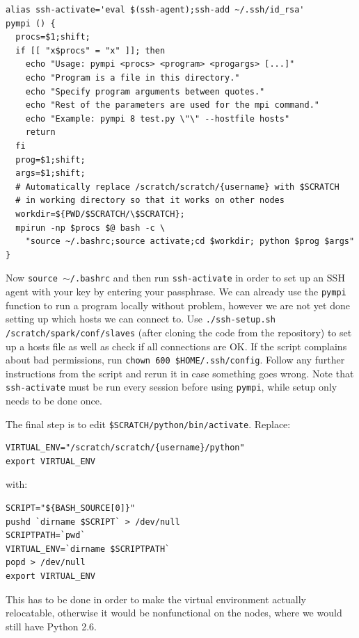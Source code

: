 \documentclass{article}
\begin{document}
\begin{verbatim}
alias ssh-activate='eval $(ssh-agent);ssh-add ~/.ssh/id_rsa'
pympi () {
  procs=$1;shift;
  if [[ "x$procs" = "x" ]]; then
    echo "Usage: pympi <procs> <program> <progargs> [...]"
    echo "Program is a file in this directory."
    echo "Specify program arguments between quotes."
    echo "Rest of the parameters are used for the mpi command."
    echo "Example: pympi 8 test.py \"\" --hostfile hosts"
    return
  fi
  prog=$1;shift;
  args=$1;shift;
  # Automatically replace /scratch/scratch/{username} with $SCRATCH
  # in working directory so that it works on other nodes
  workdir=${PWD/$SCRATCH/\$SCRATCH};
  mpirun -np $procs $@ bash -c \
    "source ~/.bashrc;source activate;cd $workdir; python $prog $args"
}
\end{verbatim}

Now \texttt{source $\sim$/.bashrc} and then run \texttt{ssh-activate} in order 
to set up an SSH agent with your key by entering your passphrase. We can 
already use the \texttt{pympi} function to run a program locally without 
problem, however we are not yet done setting up which hosts we can connect to. 
Use \texttt{./ssh-setup.sh /scratch/spark/conf/slaves} (after cloning the code 
from the repository) to set up a hosts file as well as check if all connections 
are OK\@. If the script complains about bad permissions, run \texttt{chown 600 
\$HOME/.ssh/config}. Follow any further instructions from the script and rerun 
it in case something goes wrong. Note that \texttt{ssh-activate} must be run 
every session before using \texttt{pympi}, while setup only needs to be done 
once.

The final step is to edit \texttt{\$SCRATCH/python/bin/activate}. Replace:

\begin{verbatim}
VIRTUAL_ENV="/scratch/scratch/{username}/python"
export VIRTUAL_ENV
\end{verbatim}

with:

\begin{verbatim}
SCRIPT="${BASH_SOURCE[0]}"
pushd `dirname $SCRIPT` > /dev/null
SCRIPTPATH=`pwd`
VIRTUAL_ENV=`dirname $SCRIPTPATH`
popd > /dev/null
export VIRTUAL_ENV
\end{verbatim}

This has to be done in order to make the virtual environment actually 
relocatable, otherwise it would be nonfunctional on the nodes, where we would 
still have Python 2.6.
\end{document}
